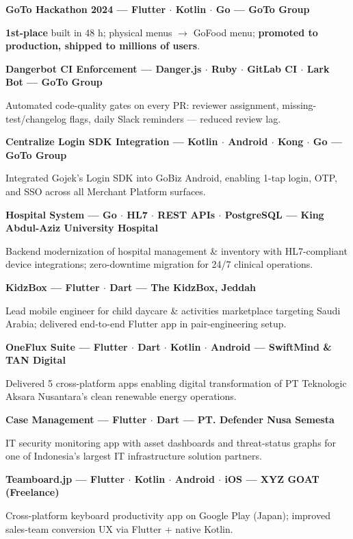 \documentclass[letterpaper,10pt]{article}
\newcommand{\resumeProjectItem}[2]{
  \item\small{
    \textbf{#1}\par\vspace{-1pt}
    #2
  }\vspace{-4pt}
}
\begin{document}
    \resumeProjectItem
      {GoTo Hackathon 2024 --- Flutter $\cdot$ Kotlin $\cdot$ Go --- GoTo Group}
      {\textbf{1st-place} built in 48 h; physical menus $\to$ GoFood menu;
       \textbf{promoted to production, shipped to millions of users}.}

    \resumeProjectItem
      {Dangerbot CI Enforcement --- Danger.js $\cdot$ Ruby $\cdot$ GitLab CI
       $\cdot$ Lark Bot --- GoTo Group}
      {Automated code-quality gates on every PR: reviewer assignment,
       missing-test/changelog flags, daily Slack reminders --- reduced review lag.}

    \resumeProjectItem
      {Centralize Login SDK Integration --- Kotlin $\cdot$ Android $\cdot$ Kong
       $\cdot$ Go --- GoTo Group}
      {Integrated Gojek's Login SDK into GoBiz Android, enabling 1-tap login, OTP, and
       SSO across all Merchant Platform surfaces.}


    \resumeProjectItem
      {Hospital System --- Go $\cdot$ HL7 $\cdot$ REST APIs $\cdot$ PostgreSQL
       --- King Abdul-Aziz University Hospital}
      {Backend modernization of hospital management \& inventory with HL7-compliant device
       integrations; zero-downtime migration for 24/7 clinical operations.}

    \resumeProjectItem
      {KidzBox --- Flutter $\cdot$ Dart --- The KidzBox, Jeddah}
      {Lead mobile engineer for child daycare \& activities marketplace targeting Saudi
       Arabia; delivered end-to-end Flutter app in pair-engineering setup.}

    \resumeProjectItem
      {OneFlux Suite --- Flutter $\cdot$ Dart $\cdot$ Kotlin $\cdot$ Android
       --- SwiftMind \& TAN Digital}
      {Delivered 5 cross-platform apps enabling digital transformation of PT Teknologic
       Aksara Nusantara's clean renewable energy operations.}

    \resumeProjectItem
      {Case Management --- Flutter $\cdot$ Dart --- PT. Defender Nusa Semesta}
      {IT security monitoring app with asset dashboards and threat-status graphs for one
       of Indonesia's largest IT infrastructure solution partners.}

    \resumeProjectItem
      {Teamboard.jp --- Flutter $\cdot$ Kotlin $\cdot$ Android $\cdot$ iOS
       --- XYZ GOAT (Freelance)}
      {Cross-platform keyboard productivity app on Google Play (Japan); improved
       sales-team conversion UX via Flutter + native Kotlin.}
\end{document}
